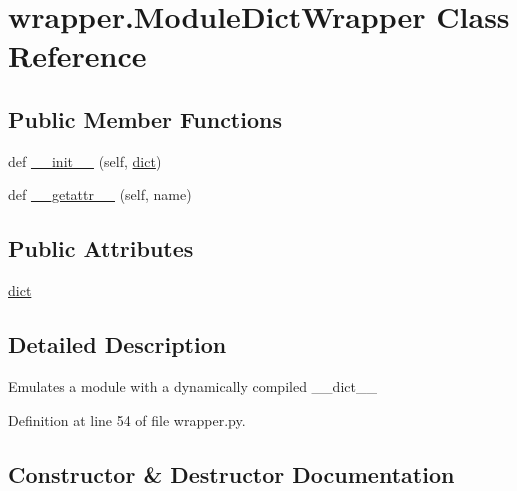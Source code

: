 \hypertarget{classwrapper_1_1ModuleDictWrapper}{}\section{wrapper.\+Module\+Dict\+Wrapper Class Reference}
\label{classwrapper_1_1ModuleDictWrapper}
\subsection*{Public Member Functions}
\begin{DoxyCompactItemize}
\item 
def \hyperlink{classwrapper_1_1ModuleDictWrapper_a9a7a794150502f51df687831583e13b9}{\+\_\+\+\_\+init\+\_\+\+\_\+} (self, \hyperlink{classwrapper_1_1ModuleDictWrapper_a5e330c40edd8bccfb13d141ebb174076}{dict})
\item 
def \hyperlink{classwrapper_1_1ModuleDictWrapper_adae96be13e70d38f587247c42a1a69a4}{\+\_\+\+\_\+getattr\+\_\+\+\_\+} (self, name)
\end{DoxyCompactItemize}
\subsection*{Public Attributes}
\begin{DoxyCompactItemize}
\item 
\hyperlink{classwrapper_1_1ModuleDictWrapper_a5e330c40edd8bccfb13d141ebb174076}{dict}
\end{DoxyCompactItemize}


\subsection{Detailed Description}
\begin{DoxyVerb}Emulates a module with a dynamically compiled __dict__\end{DoxyVerb}
 

Definition at line 54 of file wrapper.\+py.



\subsection{Constructor \& Destructor Documentation}
\mbox{\label{classwrapper_1_1ModuleDictWrapper_a9a7a794150502f51df687831583e13b9}} 

